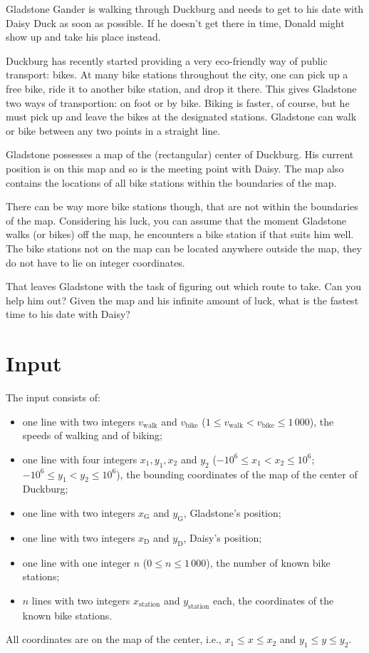 
%
\noindent
Gladstone Gander is walking through Duckburg and needs to
get to his date with Daisy Duck as soon as possible. If
he doesn't get there in time, Donald might show up and
take his place instead.

Duckburg has recently started providing
a very eco-friendly way of public transport: bikes.
At many bike stations throughout the city, one
can pick up a free bike, ride it to another bike station,
and drop it there. This gives Gladstone two ways of 
transportion: on foot or by bike. Biking is faster, of
course, but he must pick up and leave the bikes at
the designated stations. Gladstone can walk or bike
between any two points in a straight line.

Gladstone possesses a map of the (rectangular) center of
Duckburg. His current position is on this map and so is
the meeting point with Daisy. The map also contains the
locations of all bike stations within the boundaries of
the map.

There can be way more bike stations though, that are not within
the boundaries of the map. Considering his luck,
you can assume that the moment Gladstone walks (or
bikes) off the map, he encounters a bike station if that
suits him well. The bike stations not on the map can be located
anywhere outside the map, they do not have to lie on integer coordinates.

That leaves Gladstone with the task of figuring out which
route to take. Can you help him out? Given the map and his
infinite amount of luck, what is the fastest time to his 
date with Daisy?

\section*{Input}

The input consists of:
\begin{itemize}
\item one line with two integers $v_{\text{walk}}$ and $v_{\text{bike}}$
($1\le v_{\text{walk}}< v_{\text{bike}} \le 1\,000$), the speeds of
walking and of biking;
\item one line with four integers $x_1, y_1, x_2$ and $y_2$
($-10^6\le x_1< x_2\le 10^6$; $-10^6\le y_1< y_2\le 10^6$),
the bounding coordinates of the map of the center of Duckburg;
\item one line with two integers $x_{\text{G}}$ and $y_{\text{G}}$,
Gladstone's position;
\item one line with two integers $x_{\text{D}}$ and $y_{\text{D}}$,
Daisy's position;
\item one line with one integer $n$ ($0\le n\le 1\,000$), the number of known
bike stations;
\item $n$ lines with two integers $x_{\text{station}}$ and $y_{\text{station}}$ each,
the coordinates of the known bike stations.
\end{itemize}
All coordinates are on the map of the center, i.e.,
$x_1\le x\le x_2$ and $y_1\le y\le y_2$.

